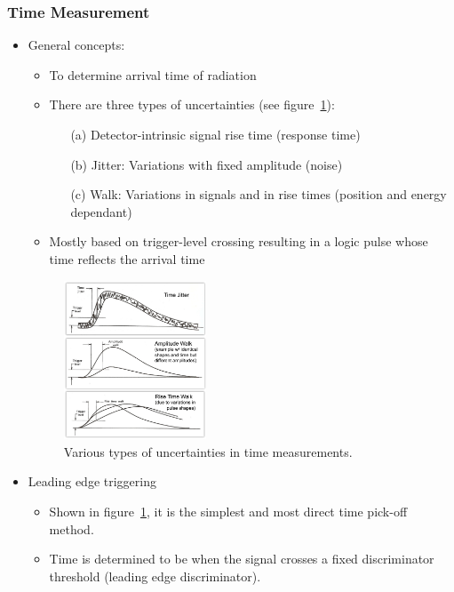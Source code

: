\subsubsection{Time Measurement}
\begin{itemize}
    \item General concepts:
    \begin{itemize}
        \item To determine arrival time of radiation
        \item There are three types of uncertainties (see figure~\ref{fig:time_measurement_unc}):
        \begin{itemize}
            \item[(a)] Detector-intrinsic signal rise time (response time)
            \item[(b)] Jitter: Variations with fixed amplitude (noise)
            \item[(c)] Walk: Variations in signals and in rise times (position and energy dependant)
        \end{itemize}
        \item Mostly based on trigger-level crossing resulting in a logic pulse whose time reflects the arrival time
    \end{itemize}
    \begin{figure}[ht]
        \centering
        \includegraphics[width=0.4\textwidth]{images/time_measurement_unc.png}
        \caption{Various types of uncertainties in time measurements.}
        \label{fig:time_measurement_unc}
    \end{figure}
    \item Leading edge triggering
    \begin{itemize}
        \item Shown in figure~\ref{fig:time_measurement_unc}, it is the simplest and most direct time pick-off method.
        \item Time is determined to be when the signal crosses a fixed discriminator threshold (leading edge discriminator).

\end{itemize}
\end{itemize}
